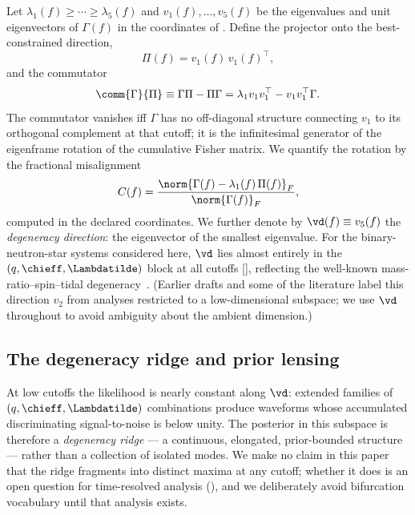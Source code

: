Let $\lambda_1(f) \ge \cdots \ge \lambda_5(f)$ and $v_1(f), \ldots,
v_5(f)$ be the eigenvalues and unit eigenvectors of $\Gamma(f)$ in the
coordinates of . Define the projector onto the
best-constrained direction,
\begin{equation}
\Pi(f) = v_1(f)\,v_1(f)^{\top},
\label{eq:projector}
\end{equation}
and the commutator
\begin{equation}
\comm{\Gamma}{\Pi} \equiv \Gamma\Pi - \Pi\Gamma
= \lambda_1 v_1 v_1^{\top} - v_1 v_1^{\top}\Gamma .
\label{eq:commutator_def}
\end{equation}
The commutator vanishes iff $\Gamma$ has no off-diagonal structure
connecting $v_1$ to its orthogonal complement at that cutoff; it is the
infinitesimal generator of the eigenframe rotation of the cumulative
Fisher matrix. We quantify the rotation by the fractional misalignment
\begin{equation}
C(f) = \frac{\norm{\Gamma(f) - \lambda_1(f)\,\Pi(f)}_F}
{\norm{\Gamma(f)}_F},
\label{eq:cross_coupling}
\end{equation}
computed in the declared coordinates. We further denote by
$\vd(f) \equiv v_5(f)$ the \emph{degeneracy direction}: the eigenvector
of the smallest eigenvalue. For the binary-neutron-star systems
considered here, $\vd$ lies almost entirely in the
$(q, \chieff, \Lambdatilde)$ block at all cutoffs
[], reflecting
the well-known mass-ratio--spin--tidal degeneracy~\cite{chatziioannou2020bns}.
(Earlier drafts and some of the literature label this direction $v_2$
from analyses restricted to a low-dimensional subspace; we use $\vd$
throughout to avoid ambiguity about the ambient dimension.)

\subsection{The degeneracy ridge and prior lensing}
\label{sec:ridge}

At low cutoffs the likelihood  is nearly constant
along $\vd$: extended families of $(q, \chieff, \Lambdatilde)$
combinations produce waveforms whose accumulated discriminating
signal-to-noise  is below unity. The posterior in this
subspace is therefore a \emph{degeneracy ridge} --- a continuous,
elongated, prior-bounded structure --- rather than a collection of
isolated modes. We make no claim in this paper that the ridge fragments
into distinct maxima at any cutoff; whether it does is an open question
for time-resolved analysis (), and we deliberately avoid
bifurcation vocabulary until that analysis exists.

